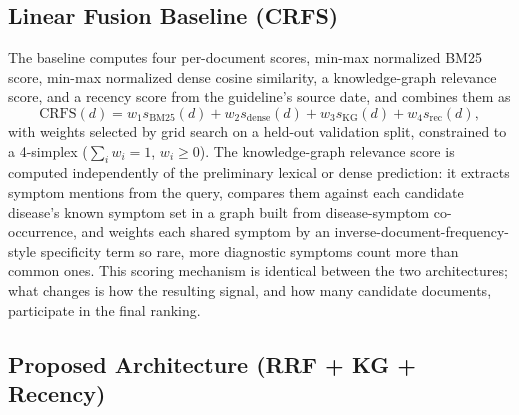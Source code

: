 \documentclass[10pt,conference]{IEEEtran}
\begin{document}
\subsection{Linear Fusion Baseline (CRFS)}
\label{ssec:crfs}

The baseline computes four per-document scores, min-max normalized BM25 score, min-max normalized dense cosine similarity, a knowledge-graph relevance score, and a recency score from the guideline's source date, and combines them as
\begin{equation}
\text{CRFS}(d) = w_1 s_{\text{BM25}}(d) + w_2 s_{\text{dense}}(d) + w_3 s_{\text{KG}}(d) + w_4 s_{\text{rec}}(d),
\label{eq:crfs}
\end{equation}
with weights selected by grid search on a held-out validation split, constrained to a 4-simplex ($\sum_i w_i = 1$, $w_i \geq 0$). The knowledge-graph relevance score is computed independently of the preliminary lexical or dense prediction: it extracts symptom mentions from the query, compares them against each candidate disease's known symptom set in a graph built from disease-symptom co-occurrence, and weights each shared symptom by an inverse-document-frequency-style specificity term so rare, more diagnostic symptoms count more than common ones. This scoring mechanism is identical between the two architectures; what changes is how the resulting signal, and how many candidate documents, participate in the final ranking.

\subsection{Proposed Architecture (RRF + KG + Recency)}
\label{ssec:proposed}
\end{document}
